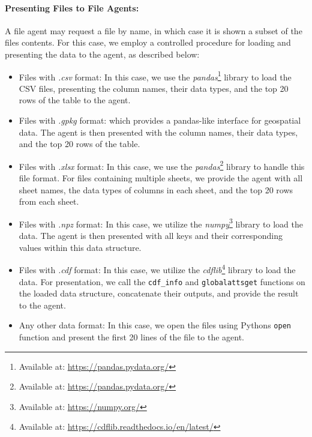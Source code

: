\paragraph{Presenting Files to File Agents:} A file agent may request a file by name, in which case it is shown a subset of the files contents. For this case, we employ a controlled procedure for loading and presenting the data to the agent, as described below:
\begin{itemize}[leftmargin=*]

\item Files with \textit{.csv} format: In this case, we use the \textit{pandas}\footnote{Available at: \url{https://pandas.pydata.org/}} library to load the CSV files, presenting the column names, their data types, and the top 20 rows of the table to the agent.

\item Files with \textit{.gpkg} format: which provides a pandas-like interface for geospatial data. The agent is then presented with the column names, their data types, and the top 20 rows of the table.

\item Files with \textit{.xlsx} format: In this case, we use the \textit{pandas}\footnote{Available at: \url{https://pandas.pydata.org/}} library to handle this file format. For files containing multiple sheets, we provide the agent with all sheet names, the data types of columns in each sheet, and the top 20 rows from each sheet.

\item Files with \textit{.npz} format: In this case, we utilize the \textit{numpy}\footnote{Available at: \url{https://numpy.org/}} library to load the data. The agent is then presented with all keys and their corresponding values within this data structure.

\item Files with \textit{.cdf} format: In this case, we utilize the \textit{cdflib}\footnote{Available at: \url{https://cdflib.readthedocs.io/en/latest/}} library to load the data. For presentation, we call the \texttt{cdf\_info} and \texttt{globalattsget} functions on the loaded data structure, concatenate their outputs, and provide the result to the agent.

\item Any other data format: In this case, we open the files using Pythons \texttt{open} function and present the first 20 lines of the file to the agent.

\end{itemize}


